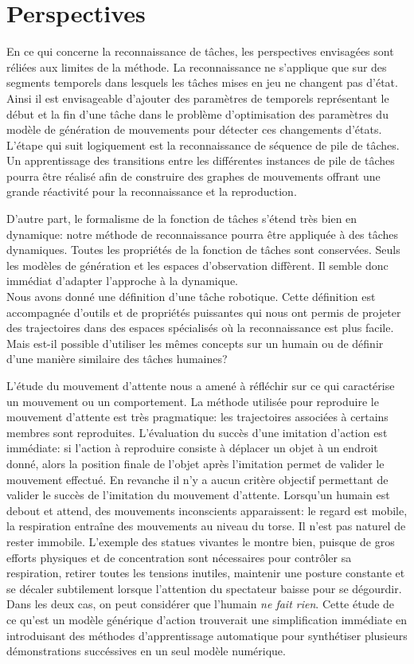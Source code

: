 \section*{Perspectives}
En ce qui concerne la reconnaissance de t\^aches,
les perspectives envisagées sont réliées aux limites
de la méthode. La reconnaissance ne s'applique que sur des segments
temporels dans lesquels les t\^aches mises en jeu ne changent pas d'état.
Ainsi il est envisageable d'ajouter des paramètres de temporels représentant le
début et la fin d'une t\^ache dans le problème 
d'optimisation des paramètres du modèle de génération de mouvements pour détecter
ces changements d'états.
L'étape qui suit logiquement est la reconnaissance de séquence de pile de t\^aches.
Un apprentissage des transitions entre les différentes instances 
de pile de t\^aches pourra être réalisé afin de construire des graphes 
de mouvements offrant une grande réactivité pour la reconnaissance et la 
reproduction.

D'autre part, le formalisme de la fonction de t\^aches
s'étend très bien en dynamique: notre méthode de reconnaissance pourra
être appliquée à des t\^aches dynamiques.
Toutes les propriétés de la fonction de t\^aches sont 
conservées. Seuls les modèles de génération et les espaces d'observation diffèrent.
Il semble donc immédiat d'adapter l'approche à la dynamique.\\

Nous avons donné une définition d'une t\^ache robotique.
Cette définition est accompagnée d'outils et de propriétés
puissantes qui nous ont permis de projeter des trajectoires
dans des espaces spécialisés où la reconnaissance est plus
facile. Mais est-il possible d'utiliser les mêmes concepts
sur un humain ou de définir d'une manière similaire des t\^aches
humaines? 

L'étude du mouvement d'attente nous a amené à réfléchir
sur ce qui caractérise un mouvement ou un comportement.
La méthode utilisée pour reproduire le mouvement
d'attente est très pragmatique: les trajectoires associées 
à certains membres sont reproduites.
L'évaluation du succès d'une imitation d'action 
est immédiate: si l'action à reproduire consiste à déplacer un objet
à un endroit donné, alors la position finale de l'objet
après l'imitation permet de valider le mouvement effectué.
En revanche il n'y a aucun critère objectif permettant de valider
le succès de l'imitation du mouvement d'attente.
Lorsqu'un humain est debout et attend,
des mouvements inconscients apparaissent: le regard
est mobile, la respiration entraîne des mouvements au niveau
du torse. Il n'est pas naturel de rester immobile.
L'exemple des statues vivantes le montre bien, puisque
de gros efforts physiques et de concentration sont nécessaires
pour contrôler sa respiration, retirer toutes les tensions inutiles, maintenir une 
posture constante et se décaler subtilement
lorsque l'attention du spectateur baisse
pour se dégourdir. Dans les deux cas, on peut considérer que l'humain \emph{ne fait rien}.
Cette étude de ce qu'est un modèle générique d'action trouverait une simplification immédiate
en introduisant des méthodes d'apprentissage automatique pour synthétiser plusieurs
démonstrations succéssives en un seul modèle numérique.
